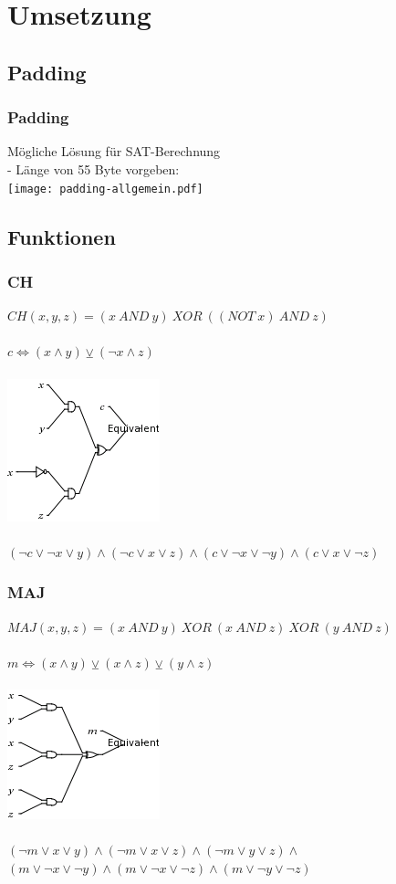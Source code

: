 \documentclass{beamer}
\begin{document}
\section{Umsetzung}
  \subsection{Padding}
    \begin{frame}
      \frametitle{Padding}
      Mögliche Lösung für SAT-Berechnung\\
      - Länge von 55 Byte vorgeben:\\
      \texttt{[image: padding-allgemein.pdf]}
    \end{frame}
  \subsection{Funktionen}
    \begin{frame}
      \frametitle{CH}
      $ CH( x, y, z) = (x~AND~y)~XOR~( (NOT~x)~AND~z) $\\
      ~\\
      $ c \Leftrightarrow (x \wedge y) \veebar ( \neg x \wedge z) $\\
      ~\\
      \includegraphics[scale=0.5]{ch.png}\\
      ~\\
      $ (\neg c \vee \neg x \vee y) \wedge (\neg c \vee x \vee z) \wedge (c \vee \neg x \vee \neg y) \wedge (c \vee x \vee \neg z) $
    \end{frame}
    \begin{frame}
      \frametitle{MAJ}
      $ MAJ( x, y, z) = (x~AND~y)~XOR~(x~AND~z)~XOR~(y~AND~z) $\\
      ~\\
      $ m \Leftrightarrow (x \wedge y) \veebar (x \wedge z) \veebar (y \wedge z) $\\
      ~\\
      \includegraphics[scale=0.5]{maj.png}\\
      ~\\
      $ (\neg m \vee x \vee y) \wedge  (\neg m \vee x \vee z) \wedge (\neg m \vee y \vee z) \wedge $\\
      $ (m \vee \neg x \vee \neg y) \wedge (m \vee \neg x \vee \neg z) \wedge (m \vee \neg y \vee \neg z) $
      \end{frame}
\end{document}
